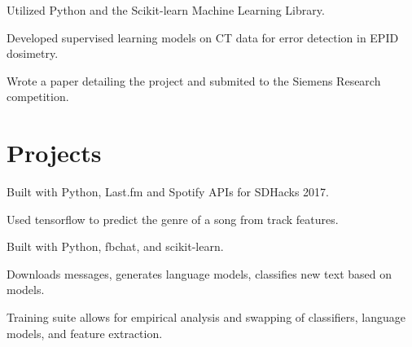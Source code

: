 \documentclass[]{deedy-resume-openfont}
\begin{document}
\begin{minipage}[t]{0.66\textwidth}
\begin{tightemize}
\item Utilized Python and the Scikit-learn Machine Learning Library.
\item Developed supervised learning models on CT data for error detection in EPID dosimetry.
\item Wrote a paper detailing the project and submited to the Siemens Research competition.
\end{tightemize}
\sectionsep


\section{Projects}

\begin{tightemize}
\item Built with Python, Last.fm and Spotify APIs for SDHacks 2017.
\item Used tensorflow to predict the genre of a song from track features.
\end{tightemize}

\vspace{2mm}

\begin{tightemize}
\item Built with Python, fbchat, and scikit-learn.
\item Downloads messages, generates language models, classifies new text based on models.
\item Training suite allows for empirical analysis and swapping of classifiers, language models, and feature extraction.
\end{tightemize}
\sectionsep



\end{minipage} 
\end{document}
